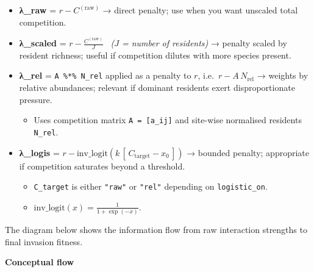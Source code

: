 \documentclass[
]{article}
\providecommand{\tightlist}{%
  \setlength{\itemsep}{0pt}\setlength{\parskip}{0pt}}
\begin{document}
\begin{itemize}
\tightlist
\item
  \textbf{λ\_raw} = \(r - C^{\mathrm{(raw)}}\) → direct penalty; use when
  you want unscaled total competition.
\item
  \textbf{λ\_scaled} = \(r - \frac{C^{\mathrm{(raw)}}}{J}\) ~\emph{(\(J\) =
  number of residents)} → penalty scaled by resident richness; useful if
  competition dilutes with more species present.
\item
  \textbf{λ\_rel} = \texttt{A\ \%*\%\ N\_rel} applied as a penalty to
  \(r\), i.e.~\(r - A\,N_{\text{rel}}\) → weights by relative
  abundances; relevant if dominant residents exert disproportionate
  pressure.

  \begin{itemize}
  \tightlist
  \item
    Uses competition matrix \texttt{A\ =\ {[}a\_ij{]}} and site-wise
    normalised residents \texttt{N\_rel}.\\
  \end{itemize}
\item
  \textbf{λ\_logis} =
  \(r - \text{inv\_logit}\!\left(k\,[\,C_{\text{target}} - x_0\,]\right)\)
  → bounded penalty; appropriate if competition saturates beyond a
  threshold.

  \begin{itemize}
  \tightlist
  \item
    \texttt{C\_target} is either \texttt{"raw"} or \texttt{"rel"}
    depending on \texttt{logistic\_on}.\\
  \item
    \(\mathrm{inv\_logit}(x) = \frac{1}{1+\exp(-x)}\).
  \end{itemize}
\end{itemize}

The diagram below shows the information flow from raw interaction
strengths to final invasion fitness.

\textbf{Conceptual flow}
\end{document}
